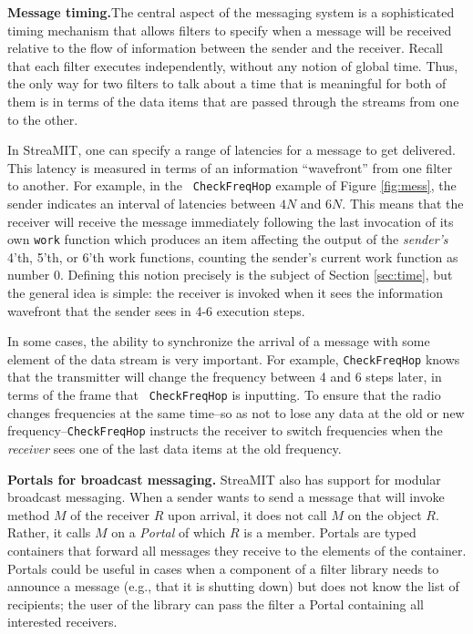 {\bf Message timing.}The central aspect of the messaging system is a
sophisticated timing mechanism that allows filters to specify when a
message will be received relative to the flow of information between
the sender and the receiver.  Recall that each filter executes
independently, without any notion of global time.  Thus, the only way
for two filters to talk about a time that is meaningful for both of
them is in terms of the data items that are passed through the streams
from one to the other.

In StreaMIT, one can specify a range of latencies for a message to get
delivered.  This latency is measured in terms of an information
``wavefront'' from one filter to another.  For example, in the {\tt
CheckFreqHop} example of Figure \ref{fig:mess}, the sender indicates
an interval of latencies between $4N$ and $6N$.  This means that the
receiver will receive the message immediately following the last
invocation of its own {\tt work} function which produces an item
affecting the output of the {\it sender's} 4'th, 5'th, or 6'th work
functions, counting the sender's current work function as number 0.
Defining this notion precisely is the subject of Section
\ref{sec:time}, but the general idea is simple:  the receiver is
invoked when it sees the information wavefront that the sender sees in
4-6 execution steps.  

In some cases, the ability to synchronize the arrival of a message
with some element of the data stream is very important.  For example,
{\tt CheckFreqHop} knows that the transmitter will change the
frequency between 4 and 6 steps later, in terms of the frame that {\tt
CheckFreqHop} is inputting.  To ensure that the radio changes
frequencies at the same time--so as not to lose any data at the old or
new frequency--{\tt CheckFreqHop} instructs the receiver to switch
frequencies when the {\it receiver} sees one of the last data items at
the old frequency.

{\bf Portals for broadcast messaging.}  StreaMIT also has support for
modular broadcast messaging.  When a sender wants to send a message
that will invoke method $M$ of the receiver $R$ upon arrival, it does
not call $M$ on the object $R$.  Rather, it calls $M$ on a {\it
Portal} of which $R$ is a member.  Portals are typed containers that
forward all messages they receive to the elements of the container.
Portals could be useful in cases when a component of a filter library
needs to announce a message (e.g., that it is shutting down) but does
not know the list of recipients; the user of the library can pass the
filter a Portal containing all interested receivers.

